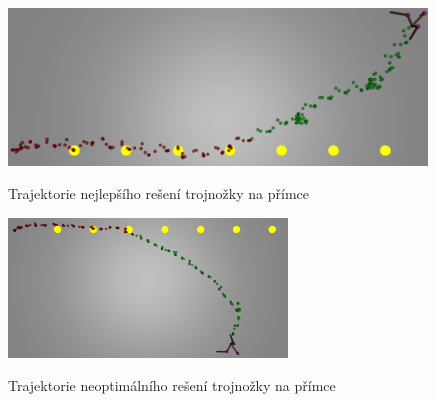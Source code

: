 \begin{figure}[h]
    \centering
    {\includegraphics[width=30em]{obrazky/trojnozka_primka_zhora_nejlepsi_reseni_trajektorie.png}}
    \caption{
    Trajektorie nejlepšího rešení trojnožky na přímce
    }
    \label{fig:trojnozka_primka_zhora_nejlepsi_reseni_trajektorie}
\end{figure}

\begin{figure}[h]
    \centering
    {\includegraphics[width=20em]{obrazky/trojnozka_primka_zhora_neoptimalni_reseni_trajektorie.png}}
    \caption{
    Trajektorie neoptimálního rešení trojnožky na přímce
    }
    \label{fig:trojnozka_primka_zhora_nejlepsi_reseni_trajektorie}
\end{figure}



